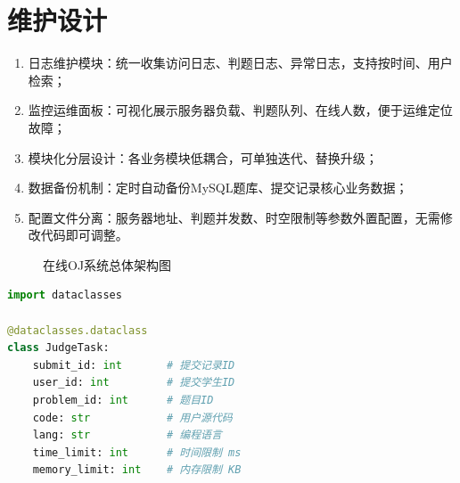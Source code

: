 \documentclass{../template/softeng}
\begin{document}
\section{维护设计}
\begin{enumerate}
    \item 日志维护模块：统一收集访问日志、判题日志、异常日志，支持按时间、用户检索；
    \item 监控运维面板：可视化展示服务器负载、判题队列、在线人数，便于运维定位故障；
    \item 模块化分层设计：各业务模块低耦合，可单独迭代、替换升级；
    \item 数据备份机制：定时自动备份MySQL题库、提交记录核心业务数据；
    \item 配置文件分离：服务器地址、判题并发数、时空限制等参数外置配置，无需修改代码即可调整。
\end{enumerate}

\begin{figure}[htbp]
    \centering
    \caption{在线OJ系统总体架构图}
\end{figure}

\begin{lstlisting}[language=Python]
import dataclasses

@dataclasses.dataclass
class JudgeTask:
    submit_id: int       # 提交记录ID
    user_id: int         # 提交学生ID
    problem_id: int      # 题目ID
    code: str            # 用户源代码
    lang: str            # 编程语言
    time_limit: int      # 时间限制 ms
    memory_limit: int    # 内存限制 KB
\end{lstlisting}
\end{document}
